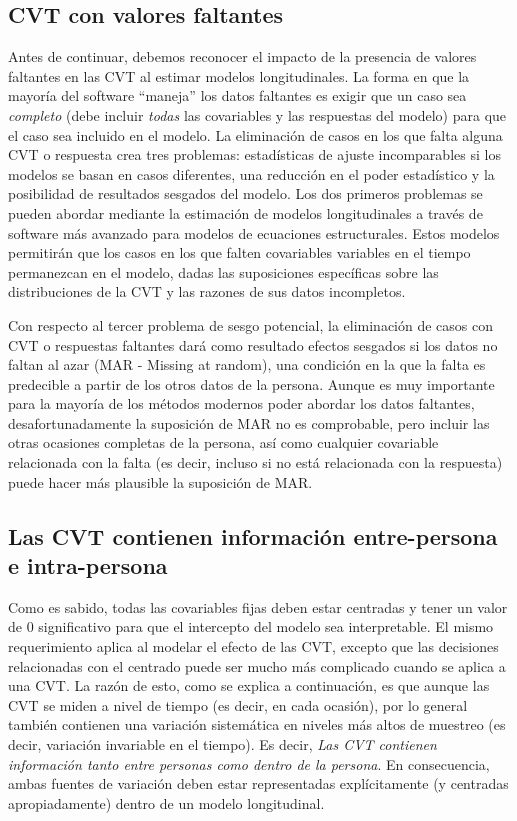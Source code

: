 \documentclass[spanish]{article}
\numberwithin{figure}{subsection}
\numberwithin{equation}{subsection}
\numberwithin{table}{subsection}
\begin{document}
\subsection{CVT con valores faltantes}

Antes de continuar, debemos reconocer el impacto de la presencia de valores faltantes en las CVT al estimar modelos
longitudinales. La forma en que la mayoría del software ``maneja'' los datos faltantes es exigir que un caso sea \textit{completo}
(debe incluir \textit{todas} las covariables y las respuestas del modelo) para que el caso sea incluido en el modelo.
La eliminación de casos en los que falta alguna CVT o respuesta crea tres problemas: estadísticas de ajuste incomparables si
los modelos se basan en casos diferentes, una reducción en el poder estadístico y la posibilidad de resultados sesgados
del modelo. Los dos primeros problemas se pueden abordar mediante la estimación de modelos longitudinales a través de
software más avanzado para modelos de ecuaciones estructurales. Estos modelos permitirán que los casos en los que falten
covariables variables en el tiempo permanezcan en el modelo, dadas las suposiciones específicas sobre las distribuciones
de la CVT y las razones de sus datos incompletos.

Con respecto al tercer problema de sesgo potencial, la eliminación de casos con CVT o respuestas faltantes dará como
resultado efectos sesgados si los datos no faltan al azar (MAR - Missing at random), una condición en la que la falta es
predecible a partir de los otros datos de la persona. Aunque es muy importante para la mayoría de los métodos modernos
poder abordar los datos faltantes, desafortunadamente la suposición de MAR no es comprobable, pero incluir las
otras ocasiones completas de la persona, así como cualquier covariable relacionada con la falta (es decir, incluso si no está
relacionada con la respuesta) puede hacer más plausible la suposición de MAR.

\subsection{Las CVT contienen información entre-persona e intra-persona}

Como es sabido, todas las covariables fijas deben estar centradas y tener un valor de 0 significativo para que el intercepto
del modelo sea interpretable. El mismo requerimiento aplica al modelar el efecto de las CVT, excepto que las decisiones
relacionadas con el centrado puede ser mucho más complicado cuando se aplica a una CVT. La razón de esto, como se explica
a continuación, es que aunque las CVT se miden a nivel de tiempo (es decir, en cada ocasión), por lo general también
contienen una variación sistemática en niveles más altos de muestreo (es decir, variación invariable en el tiempo). Es decir,
\textit{Las CVT contienen información tanto entre personas como dentro de la persona}. En consecuencia, ambas fuentes de
variación deben estar representadas explícitamente (y centradas apropiadamente) dentro de un modelo longitudinal.
\end{document}
